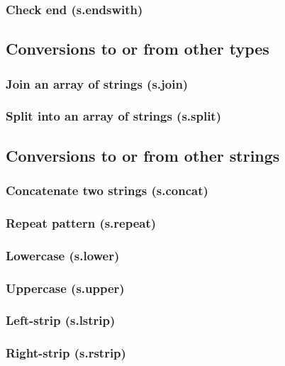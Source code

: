 \documentclass{article}
\theoremstyle{definition}
\begin{document}
\subsubsection{Check end (s.endswith)}

\subsection{Conversions to or from other types}

\subsubsection{Join an array of strings (s.join)}

\subsubsection{Split into an array of strings (s.split)}

\subsection{Conversions to or from other strings}

\subsubsection{Concatenate two strings (s.concat)}

\subsubsection{Repeat pattern (s.repeat)}

\subsubsection{Lowercase (s.lower)}

\subsubsection{Uppercase (s.upper)}

\subsubsection{Left-strip (s.lstrip)}

\subsubsection{Right-strip (s.rstrip)}
\end{document}
